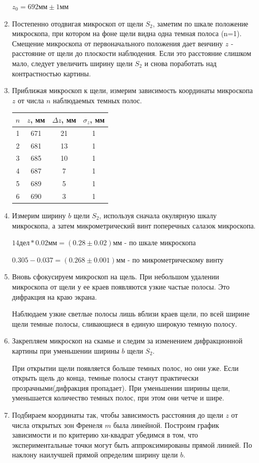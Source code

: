 \documentclass[a4paper,12pt]{article}
\begin{document}
\begin{enumerate}
    $z_0=692\text{мм}\pm 1\text{мм}$
    \item Постепенно отодвигая микроскоп от щели $S_2$, заметим по шкале положение микроскопа, при котором на фоне щели видна одна темная полоса (n=1). Смещение микроскопа от первоначального положения дает веичину $z$ - расстояние от щели до плоскости наблюдения. Если это расстояние слишком мало, следует увеличить ширину щели $S_2$ и снова поработать над контрастностью картины.
    \item Приближая микроскоп к щели, измерим зависимость координаты микроскопа $z$ от числа $n$ наблюдаемых темных полос.
    \begin{table}[h!]
    \centering
    \begin{tabular}{||c|c|c|c||}
    \hline
        $n$ & $z$, мм & $\Delta z$, мм & $\sigma_z$, мм  \\
        \hline
        1 & 671 & 21 & 1 \\
        2 & 681 & 13 & 1 \\
        3 & 685 & 10 & 1 \\
        4 & 687 & 7 & 1 \\
        5 & 689 & 5 & 1 \\
        6 & 690 & 3 & 1 \\
        \hline
    \end{tabular}
    \end{table}

    \item Измерим ширину $b$ щели $S_2$, используя сначала окулярную шкалу микроскопа, а затем микрометрический винт поперечных салазок микроскопа.
    
    $14\text{дел} * 0.02\text{мм} = (0.28\pm0.02)\text{мм}$ - по шкале микроскопа

    $0.305-0.037 = (0.268\pm0.001)\text{мм}$ - по микрометрическому винту

    \item Вновь сфокусируем микроскоп на щель. При небольшом удалении микроскопа от щели у ее краев появляются узкие частые полосы. Это дифракция на краю экрана.

    Наблюдаем узкие светлые полосы лишь вблизи краев щели, по всей ширине щели темные полосы, сливающиеся в единую широкую темную полосу.
    \item Закрепляем микроскоп на скамье и следим за изменением дифракционной картины при уменьшении ширины $b$ щели $S_2$.

    При открытии щели появляется больше темных полос, но они уже. Если открыть щель до конца, темные полосы станут практически прозрачными(дифракция пропадает). При уменьшении ширины щели, уменьшается количество темных полос, при этом они четче и шире.
    \item Подбираем координаты так, чтобы зависимость расстояния до щели $z$ от числа открытых зон Френеля $m$ была линейной. Построим график зависимости и по критерию хи-квадрат убедимся в том, что экспериментальные точки могут быть аппроксимированы прямой линией. По наклону наилучшей прямой определим ширину щели $b$.


\end{enumerate}
\end{document}
